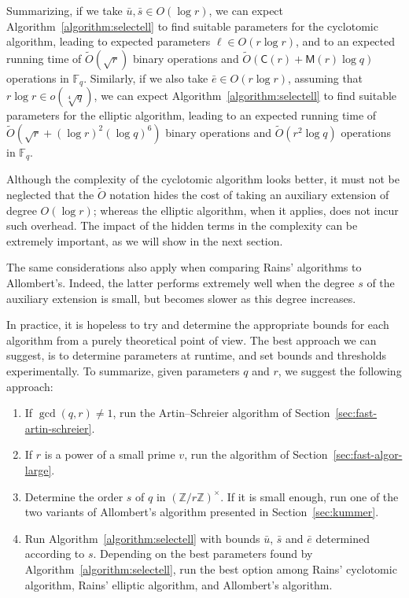 \documentclass[12pt]{article}
\theoremstyle{plain}
\theoremstyle{definition}
\newcommand{\tildO}{\tilde{O}}
\def\Z{\ensuremath{\mathbb{Z}}}
\def\F{\ensuremath{\mathbb{F}}}
\def\MM{\ensuremath{\mathsf{M}}}
\def\CC{\ensuremath{\mathsf{C}}}
\newcounter{algorithm}
\begin{document}
Summarizing, if we take $\bar{u},\bar{s}\in O(\log r)$, we can expect
Algorithm~\ref{algorithm:selectell} to find suitable parameters for
the cyclotomic algorithm, leading to expected parameters $\ell\in
O(r\log r)$, and to an expected running time of $\tildO(\sqrt{r})$
binary operations and $\tildO(\CC(r)+\MM(r)\log q)$ operations in
$\F_q$.  Similarly, if we also take $\bar{e}\in O(r\log r)$,
assuming that $r\log r\in o(\sqrt[4]{q})$, we can expect
Algorithm~\ref{algorithm:selectell} to find suitable parameters for
the elliptic algorithm, leading to an expected running time of
$\tildO(\sqrt{r}+(\log r)^2(\log q)^6)$ binary operations and
$\tildO(r^2\log q)$ operations in $\F_q$.

Although the complexity of the cyclotomic algorithm looks better, it
must not be neglected that the $\tildO$ notation
hides the cost of taking an auxiliary extension of degree
$O(\log r)$; whereas the elliptic algorithm, when it applies, does
not incur such overhead. The impact of the hidden terms in the
complexity can be extremely important, as we will show in the next
section. 

The same considerations also apply when comparing Rains' algorithms to
Allombert's. Indeed, the latter performs extremely well when the
degree $s$ of the auxiliary extension is small, but becomes slower as
this degree increases.

In practice, it is hopeless to try and determine the appropriate
bounds for each algorithm from a purely theoretical point of view. The
best approach we can suggest, is to determine parameters at runtime,
and set bounds and thresholds experimentally.
To summarize, given parameters $q$ and $r$, we suggest
the following approach:
\begin{enumerate}
\item If $\gcd(q,r)\ne 1$, run the Artin--Schreier algorithm of
  Section~\ref{sec:fast-artin-schreier}.
\item If $r$ is a power of a small prime $v$, run the algorithm of
  Section~\ref{sec:fast-algor-large}.
\item Determine the order $s$ of $q$ in $(\Z/r\Z)^\times$. If it is
  small enough, run one of the two variants of Allombert's algorithm
  presented in Section~\ref{sec:kummer}.
\item Run Algorithm~\ref{algorithm:selectell} with bounds $\bar{u}$,
  $\bar{s}$ and $\bar{e}$ determined according to $s$. Depending on
  the best parameters found by Algorithm~\ref{algorithm:selectell},
  run the best option among Rains' cyclotomic algorithm, Rains'
  elliptic algorithm, and Allombert's algorithm.
\end{enumerate}
\end{document}
